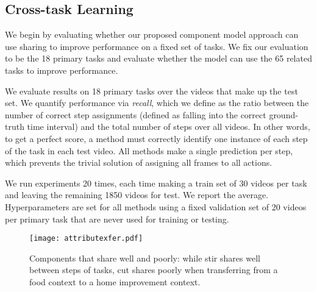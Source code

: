 \documentclass[10pt,twocolumn,letterpaper]{article}
\begin{document}
\subsection{Cross-task Learning}
\label{subsec:exp_multitask}

We begin by evaluating whether our proposed component model approach can use sharing to improve performance on a fixed set of tasks.
We fix our evaluation to be the 18 primary tasks and evaluate whether the model can use the 65
related tasks to improve performance.

 We evaluate results on 18 primary tasks over the videos that
make up the test set. We quantify performance via {\it recall}, which we
define as the ratio between the number of correct step assignments (defined as
falling into the correct ground-truth time interval) and the total
number of steps over all videos. In other words, to get a perfect score, a method
must correctly identify one instance of each step of the task in each test video.
All methods make a single prediction per step, which prevents the trivial solution of assigning all frames to all actions.

We run experiments 20 times, each time making a train set of 30 videos per
task and leaving the remaining 1850 videos for test. We report the average.
Hyperparameters are set for all methods using a fixed validation set of 20
videos per primary task that are never used for training or testing.

\begin{figure}[t]
\begin{center}
    \texttt{[image: attributexfer.pdf]}
   \caption{Components that share well and poorly: while stir shares well between steps of tasks, cut shares poorly when
       transferring from a food context to a home improvement context.}
   \label{fig:qualitative_share}
\end{center}
\vspace{-0.2in}
\end{figure}
\end{document}
